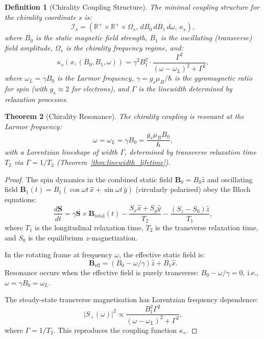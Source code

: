 \documentclass[twocolumn,10pt,a4paper]{article}
\newtheorem{theorem}{Theorem}[section]
\newtheorem{definition}[theorem]{Definition}
\theoremstyle{remark}
\newcommand{\Reals}{\mathbb{R}}
\begin{document}
\begin{definition}[Chirality Coupling Structure]
\label{def:chirality_coupling}
The minimal coupling structure for the chirality coordinate $s$ is:
\begin{equation}
\mathcal{I}_s = \left( \Reals^+ \times \Reals^+ \times \Omega_s, \, dB_0 \, dB_1 \, d\omega, \, \kappa_s \right),
\end{equation}
where $B_0$ is the static magnetic field strength, $B_1$ is the oscillating (transverse) field amplitude, $\Omega_s$ is the chirality frequency regime, and:
\begin{equation}
\kappa_s(x, (B_0, B_1, \omega)) = \gamma^2 B_1^2 \cdot \frac{\Gamma^2}{(\omega - \omega_L)^2 + \Gamma^2},
\end{equation}
where $\omega_L = \gamma B_0$ is the Larmor frequency, $\gamma = g_s \mu_B / \hbar$ is the gyromagnetic ratio for spin (with $g_s \approx 2$ for electrons), and $\Gamma$ is the linewidth determined by relaxation processes.

\end{definition}

\begin{theorem}[Chirality Resonance]
\label{thm:chirality_resonance}
The chirality coupling is resonant at the Larmor frequency:
\begin{equation}
\omega = \omega_L = \gamma B_0 = \frac{g_s \mu_B B_0}{\hbar},
\end{equation}
with a Lorentzian lineshape of width $\Gamma$, determined by transverse relaxation time $T_2$ via $\Gamma = 1/T_2$ (Theorem~\ref{thm:linewidth_lifetime}).
\end{theorem}

\begin{proof}
The spin dynamics in the combined static field $\mathbf{B}_0 = B_0 \hat{z}$ and oscillating field $\mathbf{B}_1(t) = B_1 (\cos\omega t \, \hat{x} + \sin\omega t \, \hat{y})$ (circularly polarised) obey the Bloch equations:
\begin{equation}
\frac{d\mathbf{S}}{dt} = \gamma \mathbf{S} \times \mathbf{B}_{\text{total}}(t) - \frac{S_x \hat{x} + S_y \hat{y}}{T_2} - \frac{(S_z - S_0) \hat{z}}{T_1},
\end{equation}
where $T_1$ is the longitudinal relaxation time, $T_2$ is the transverse relaxation time, and $S_0$ is the equilibrium $z$-magnetization.

In the rotating frame at frequency $\omega$, the effective static field is:
\begin{equation}
\mathbf{B}_{\text{eff}} = (B_0 - \omega/\gamma) \hat{z} + B_1 \hat{x}.
\end{equation}
Resonance occurs when the effective field is purely transverse: $B_0 - \omega/\gamma = 0$, i.e., $\omega = \gamma B_0 = \omega_L$.

The steady-state transverse magnetisation has Lorentzian frequency dependence:
\begin{equation}
|S_\perp(\omega)|^2 \propto \frac{B_1^2 \Gamma^2}{(\omega - \omega_L)^2 + \Gamma^2},
\end{equation}
where $\Gamma = 1/T_2$. This reproduces the coupling function $\kappa_s$.
\end{proof}
\end{document}
